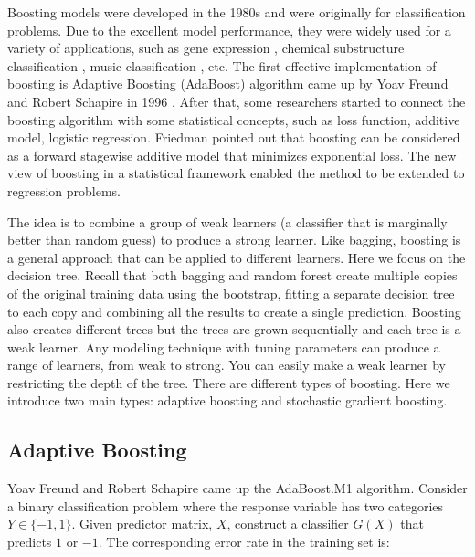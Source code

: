 \documentclass[12pt,]{krantz}
\begin{document}
Boosting models were developed in the 1980s \citep{Valiant1984, KV1989} and were originally for classification problems. Due to the excellent model performance, they were widely used for a variety of applications, such as gene expression \citep{dudoit2002, bendor2000}, chemical substructure classification \citep{Varmuza2003}, music classification \citep{Bergstra2006}, etc. The first effective implementation of boosting is Adaptive Boosting (AdaBoost) algorithm came up by Yoav Freund and Robert Schapire in 1996 \citep{Schapire1999}. After that, some researchers \citep{Friedman2000} started to connect the boosting algorithm with some statistical concepts, such as loss function, additive model, logistic regression. Friedman pointed out that boosting can be considered as a forward stagewise additive model that minimizes exponential loss. The new view of boosting in a statistical framework enabled the method to be extended to regression problems.

The idea is to combine a group of weak learners (a classifier that is marginally better than random guess) to produce a strong learner. Like bagging, boosting is a general approach that can be applied to different learners. Here we focus on the decision tree. Recall that both bagging and random forest create multiple copies of the original training data using the bootstrap, fitting a separate decision tree to each copy and combining all the results to create a single prediction. Boosting also creates different trees but the trees are grown sequentially and each tree is a weak learner. Any modeling technique with tuning parameters can produce a range of learners, from weak to strong. You can easily make a weak learner by restricting the depth of the tree. There are different types of boosting. Here we introduce two main types: adaptive boosting and stochastic gradient boosting.

\hypertarget{adaptive-boosting}{%
\subsection{Adaptive Boosting}\label{adaptive-boosting}}

Yoav Freund and Robert Schapire \citep{Freund1997} came up the AdaBoost.M1 algorithm. Consider a binary classification problem where the response variable has two categories \(Y \in \{-1, 1\}\). Given predictor matrix, \(X\), construct a classifier \(G(X)\) that predicts \(1\) or \(-1\). The corresponding error rate in the training set is:
\end{document}

